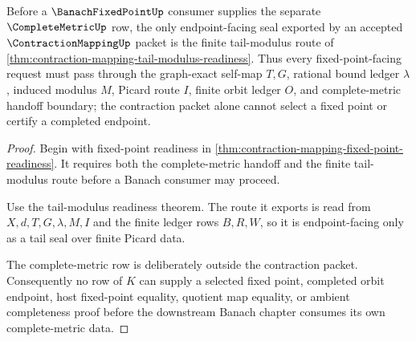\begin{theorem}
\label{thm:contraction-mapping-fixed-point-tail-seal}
Before a $\BanachFixedPointUp$ consumer supplies the separate $\CompleteMetricUp$ row, the only endpoint-facing seal exported by an accepted $\ContractionMappingUp$ packet is the finite tail-modulus route of \autoref{thm:contraction-mapping-tail-modulus-readiness}. Thus every fixed-point-facing request must pass through the graph-exact self-map $T,G$, rational bound ledger $\lambda$, induced modulus $M$, Picard route $I$, finite orbit ledger $O$, and complete-metric handoff boundary; the contraction packet alone cannot select a fixed point or certify a completed endpoint.
\end{theorem}
\begin{proof}
Begin with fixed-point readiness in \autoref{thm:contraction-mapping-fixed-point-readiness}. It requires both the complete-metric handoff and the finite tail-modulus route before a Banach consumer may proceed.

Use the tail-modulus readiness theorem. The route it exports is read from $X,d,T,G,\lambda,M,I$ and the finite ledger rows $B,R,W$, so it is endpoint-facing only as a tail seal over finite Picard data.

The complete-metric row is deliberately outside the contraction packet. Consequently no row of $K$ can supply a selected fixed point, completed orbit endpoint, host fixed-point equality, quotient map equality, or ambient completeness proof before the downstream Banach chapter consumes its own complete-metric data.
\end{proof}

